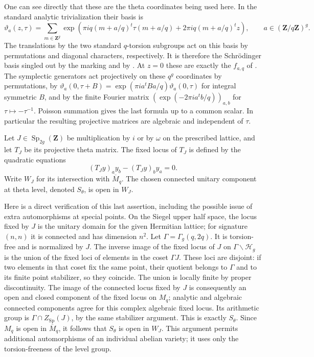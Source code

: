 \documentclass[11pt]{article}
\theoremstyle{definition}
\theoremstyle{remark}
\begin{document}
One can see directly that these are the theta coordinates being
used here.  In the standard analytic trivialization their basis is
\[
 \vartheta_a(z,\tau)=
 \sum_{m\in\mathbf Z^g}
 \exp\!\left(\pi i q(m+a/q)^t\tau(m+a/q)
       +2\pi i q(m+a/q)^tz\right),
 \qquad a\in(\mathbf Z/q\mathbf Z)^g.
\]
The translations by the two standard $q$-torsion subgroups
act on this basis by permutations and diagonal characters,
respectively.  It is therefore the Schr\"odinger basis singled
out by the marking and by
\cite[Proposition~3 and Theorem~2, pp.~295--298]{Mumford1966I}.
At $z=0$ these are exactly the $f_{a,q}$ of
\cite[Introduction, p.~1]{FreitagSalvatiManni2016}.
The symplectic generators act projectively on these $q^g$
coordinates by permutations, by
$\vartheta_a(0,\tau+B)=\exp(\pi i a^tBa/q)\vartheta_a(0,\tau)$
for integral symmetric $B$, and by the finite Fourier matrix
$(\exp(-2\pi i a^tb/q))_{a,b}$ for
$\tau\mapsto-\tau^{-1}$.  Poisson summation gives the last
formula up to a common scalar.  In particular the resulting
projective matrices are algebraic and independent of $\tau$.

Let $J\in\operatorname{Sp}_{2g}(\mathbf Z)$ be multiplication by
$i$ or by $\omega$ on the prescribed lattice, and let $T_J$ be
its projective theta matrix.  The fixed locus of $T_J$ is defined
by the quadratic equations
\[
 (T_Jy)_a y_b-(T_Jy)_b y_a=0.
\]
Write $W_J$ for its intersection with $\overline M_q$.
The chosen connected unitary component at theta level, denoted
$S_\theta$, is open in $W_J$.

Here is a direct verification of this last assertion, including
the possible issue of extra automorphisms at special points.
On the Siegel upper half space, the locus fixed by $J$ is the
unitary domain for the given Hermitian lattice; for signature
$(n,n)$ it is connected and has dimension $n^2$.
Let $\Gamma=\Gamma_g(q,2q)$.  It is torsion-free and is
normalized by $J$.  The inverse image of the fixed locus of $J$
on $\Gamma\backslash\mathcal H_g$ is the union of the fixed
loci of elements in the coset $\Gamma J$.  These loci are
disjoint: if two elements in that coset fix the same point,
their quotient belongs to $\Gamma$ and to its finite point
stabilizer, so they coincide.  The union is locally finite by
proper discontinuity.  The image of the connected locus fixed
by $J$ is consequently an open and closed component of the
fixed locus on $M_q$; analytic and algebraic connected components
agree for this complex algebraic fixed locus.  Its arithmetic group is
$\Gamma\cap Z_{\operatorname{Sp}}(J)$, by the same stabilizer
argument.  This is exactly $S_\theta$.  Since $M_q$ is open in
$\overline M_q$, it follows that $S_\theta$ is open in $W_J$.
This argument permits additional automorphisms of an individual
abelian variety; it uses only the torsion-freeness of the level
group.
\end{document}

